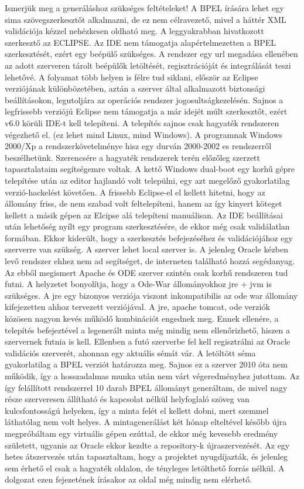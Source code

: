 Ismerjük meg a generáláshoz szükséges feltételeket! A BPEL írására lehet egy sima szövegszerkesztőt alkalmazni, de ez nem célravezető, mivel a háttér XML validációja kézzel nehézkesen oldható meg. A leggyakrabban hivatkozott szerkesztő az ECLIPSE. Az IDE nem támogatja alapértelmezetten a BPEL szerkesztését, ezért egy beépülő szükséges. A rendszer egy url megadása ellenében az adott szerveren tárolt beépülők letöltését, regisztrációját és integrálását teszi lehetővé. A folyamat több helyen is félre tud siklani, először az Eclipse verziójának különbözetében, aztán a szerver által alkalmazott biztonsági beállításokon, legutoljára az operációs rendszer jogosultságkezelésén. Sajnos a legfrissebb verziójú Eclipse nem támogatja a már idejét múlt szerkesztőt, ezért v6.0 körüli IDE-t kell telepíteni. A telepítés sajnos csak hagyaték rendszeren végezhető el. (ez lehet mind Linux, mind Windows). A programnak Windows 2000/Xp a rendszerkövetelménye hisz egy durván 2000-2002 es rendszerről beszélhetünk. Szerencsére a hagyaték rendszerek terén előzőleg szerzett tapasztalataim segítségemre voltak. A kettő Windows dual-boot egy korhű gépre telepítése után az editor hajlandó volt települni, egy azt megelőző gyakorlatilag verzió-hackelést követően. A frissebb Eclipse-el el kellett hitetni, hogy az állomány friss, de nem szabad volt feltelepíteni, hanem az így kinyert köteget kellett a másik gépen az Elcipse alá telepíteni manuálisan. Az IDE beállításai után lehetőség nyílt egy program szerkesztésére, de ekkor még csak validálatlan formában. Ekkor kiderült, hogy a szerkesztés befejezéséhez és validációjához egy szerverre van szükség. A szerver lehet local szerver is. A jelenleg Oracle kézben levő rendszer ehhez nem ad segítséget, de interneten található hozzá segédanyag.\cite{helloworld} Az ebből megismert Apache és ODE szerver szintén csak korhű rendszeren tud futni. A helyzetet bonyolítja, hogy a Ode-War állományokhoz jre + jvm is szükséges. A jre egy bizonyos verziója viszont inkompatibilis az ode war állomány kifejezetten ahhoz tervezett verziójával. A jre, apache tomcat, ode verziók közösen nagyon kevés működő kombinációt engednek meg. Ennek ellenére, a telepítés befejeztével a legenerált minta még mindig nem ellenőrizhető, hiszen a szervernek futnia is kell. Ellenben a futó szerverbe fel kell regisztrálni az Oracle validációs szerverét, ahonnan egy aktuális sémát vár. A letöltött séma gyakorlatilag  a BPEL verziót határozza meg. Sajnos ez a szerver 2010 óta nem működik, így a hosszadalmas munka után nem várt végeredményhez jutottam. Az így felállított rendszerrel 10 darab BPEL állományt generáltam, de mivel nagy része szerveresen állítható és kapcsolat nélkül helyfoglaló szöveg van kulcsfontosságú helyeken, így a minta felét el kellett dobni, mert szemmel láthatólag nem volt helyes. A mintagenerálást két hónap elteltével később újra megpróbáltam egy virtuális gépen ezúttal, de ekkor még kevesebb eredmény született, ugyanis az Oracle ekkor kezdte a repository-k újraszervezését. Az egy hetes átszervezés után tapasztaltam, hogy a projektet nyugdíjazták, és jelenleg sem érhető el csak a hagyaték oldalon, de tényleges letölthető forrás nélkül. A dolgozat ezen fejezetének írásakor az oldal még mindig nem elérhető. 

